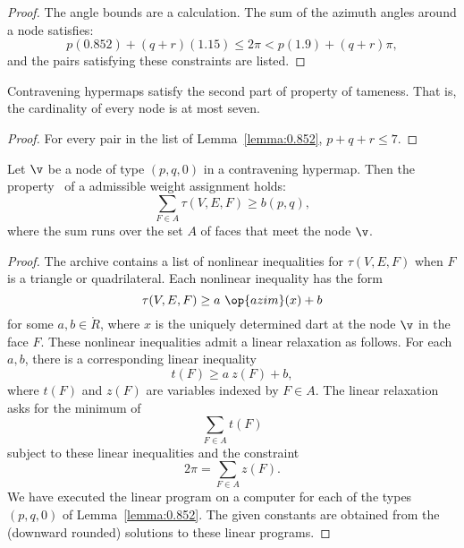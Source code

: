 \begin{proof}
The angle bounds are a calculation.  The sum of the azimuth angles
around a node satisfies:
\[ 
p (0.852) + (q+r) (1.15) \le 2\pi < p (1.9) + (q+r) \pi,
\] 
and the pairs satisfying these constraints are listed.
\end{proof}

\begin{lemma}[]\label{lemma:node-upper}
Contravening hypermaps satisfy the second part of property 
of tameness.  That is, the cardinality of every
node is at most seven.
\end{lemma}

\begin{proof}  For every pair in the list of Lemma~\ref{lemma:0.852},  $p+q+r\le 7$.
\end{proof}




\begin{lemma}[] \label{lemma:weightB}
  Let $\v$ be a node of type $(p,q,0)$ in a contravening hypermap.
  Then the property~ of a admissible weight assignment
  holds:
\[ 
\sum_{ F\in A} \tau(V,E,F) \ge  b(p,q),
\] 
where the sum runs over the set $A$ of faces that meet the node $\v$.
\end{lemma}
%
%

\begin{proof}   The archive
  \cite[FUSDSPJ]{hales:2009:nonlinear} contains a list of nonlinear
  inequalities for $\tau(V,E,F)$ when $F$ is a triangle or
  quadrilateral. Each nonlinear inequality has the form
\[ \tau(V,E,F) \ge a~\op{azim}(x) + b\] 
for some $a,b\in\ring{R}$, where $x$ is the uniquely determined dart
at the node $\v$ in the face $F$.  These nonlinear inequalities admit
a linear relaxation as follows.  For each $a,b$, there is a corresponding
linear inequality %
%
\[ 
t(F) \ge a~z(F) + b,
\] 
where $t(F)$ and $z(F)$ are variables indexed by $F\in A$.
%
%
%
The linear relaxation asks for the minimum of 
\[ \sum_{F\in A} t(F)\] 
subject to these linear inequalities and the constraint
\[ 
2\pi = \sum_{F\in A} z(F).
\] 
We have executed the linear program on a computer for each of the
types $(p,q,0)$ of Lemma~\ref{lemma:0.852}. The given constants are
obtained from the (downward rounded) solutions to these linear
programs.
\end{proof}

